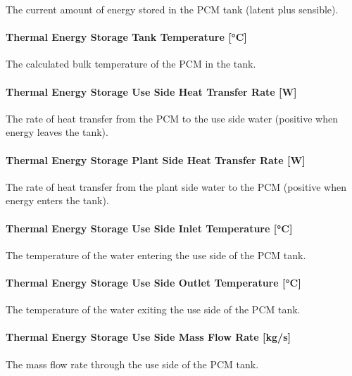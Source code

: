 The current amount of energy stored in the PCM tank (latent plus sensible).

\paragraph{Thermal Energy Storage Tank Temperature [°C]}\label{pcmstorage-tank-temperature}

The calculated bulk temperature of the PCM in the tank.

\paragraph{Thermal Energy Storage Use Side Heat Transfer Rate [W]}\label{pcmstorage-use-side-heat-transfer-rate}

The rate of heat transfer from the PCM to the use side water (positive when energy leaves the tank).

\paragraph{Thermal Energy Storage Plant Side Heat Transfer Rate [W]}\label{pcmstorage-plant-side-heat-transfer-rate}

The rate of heat transfer from the plant side water to the PCM (positive when energy enters the tank).

\paragraph{Thermal Energy Storage Use Side Inlet Temperature [°C]}\label{pcmstorage-use-side-inlet-temperature}

The temperature of the water entering the use side of the PCM tank.

\paragraph{Thermal Energy Storage Use Side Outlet Temperature [°C]}\label{pcmstorage-use-side-outlet-temperature}

The temperature of the water exiting the use side of the PCM tank.

\paragraph{Thermal Energy Storage Use Side Mass Flow Rate [kg/s]}\label{pcmstorage-use-side-mass-flow-rate}

The mass flow rate through the use side of the PCM tank.

